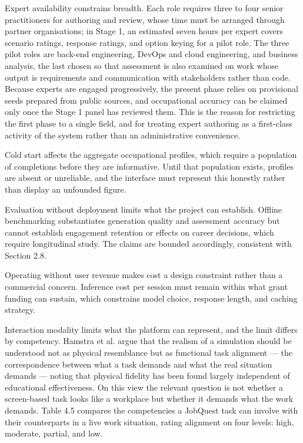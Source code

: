 Expert availability constrains breadth. Each role requires three to four senior practitioners for authoring and review, whose time must be arranged through partner organisations; in Stage 1, an estimated seven hours per expert covers scenario ratings, response ratings, and option keying for a pilot role. The three pilot roles are back-end engineering, DevOps and cloud engineering, and business analysis, the last chosen so that assessment is also examined on work whose output is requirements and communication with stakeholders rather than code. Because experts are engaged progressively, the present phase relies on provisional seeds prepared from public sources, and occupational accuracy can be claimed only once the Stage 1 panel has reviewed them. This is the reason for restricting the first phase to a single field, and for treating expert authoring as a first-class activity of the system rather than an administrative convenience.

Cold start affects the aggregate occupational profiles, which require a population of completions before they are informative. Until that population exists, profiles are absent or unreliable, and the interface must represent this honestly rather than display an unfounded figure.

Evaluation without deployment limits what the project can establish. Offline benchmarking substantiates generation quality and assessment accuracy but cannot establish engagement retention or effects on career decisions, which require longitudinal study. The claims are bounded accordingly, consistent with Section 2.8.

Operating without user revenue makes cost a design constraint rather than a commercial concern. Inference cost per session must remain within what grant funding can sustain, which constrains model choice, response length, and caching strategy.

Interaction modality limits what the platform can represent, and the limit differs by competency. Hamstra et al.\cite{r98} argue that the realism of a simulation should be understood not as physical resemblance but as functional task alignment --- the correspondence between what a task demands and what the real situation demands --- noting that physical fidelity has been found largely independent of educational effectiveness. On this view the relevant question is not whether a screen-\allowbreak{}based task looks like a workplace but whether it demands what the work demands. Table 4.5 compares the competencies a JobQuest task can involve with their counterparts in a live work situation, rating alignment on four levels: high, moderate, partial, and low.

